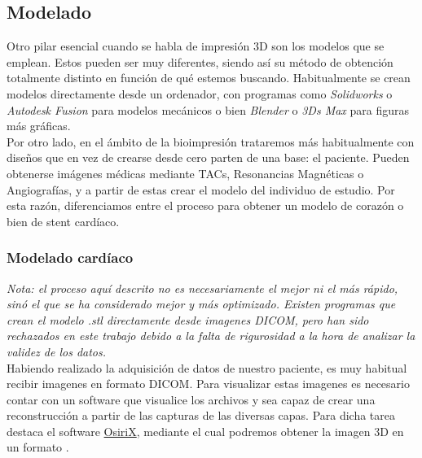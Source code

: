 \documentclass[a4paper,12pt]{article}
\begin{document}





\subsection{Modelado}
Otro pilar esencial cuando se habla de impresión 3D son los modelos que se emplean. Estos pueden ser muy diferentes, siendo así su método de obtención totalmente distinto en función de qué estemos buscando. Habitualmente se crean modelos directamente desde un ordenador, con programas como \emph{Solidworks} o \emph{Autodesk Fusion} para modelos mecánicos o bien \emph{Blender} o \emph{3Ds Max} para figuras más gráficas.\\

Por otro lado, en el ámbito de la bioimpresión trataremos más habitualmente con diseños que en vez de crearse desde cero parten de una base: el paciente. Pueden obtenerse imágenes médicas mediante TACs, Resonancias Magnéticas o Angiografías, y a partir de estas crear el modelo del individuo de estudio. Por esta razón, diferenciamos entre el proceso para obtener un modelo de corazón o bien de stent cardíaco.\\

\subsubsection{Modelado cardíaco}
\emph{Nota: el proceso aquí descrito no es necesariamente el mejor ni el más rápido, sinó el que se ha considerado mejor y más optimizado. Existen programas que crean el modelo .stl directamente desde imagenes DICOM, pero han sido rechazados en este trabajo debido a la falta de rigurosidad a la hora de analizar la validez de los datos.}\\

Habiendo realizado la adquisición de datos de nuestro paciente, es muy habitual recibir imagenes en formato DICOM. Para visualizar estas imagenes es necesario contar con un software que visualice los archivos y sea capaz de crear una reconstrucción a partir de las capturas de las diversas capas. Para dicha tarea destaca el software \href{http://www.osirix-viewer.com/}{OsiriX}, mediante el cual podremos obtener la imagen 3D en un formato .\\
\end{document}
